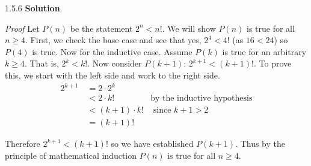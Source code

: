 \documentclass[11pt,]{book}
\makeatletter
\theoremstyle{ptxplainnotitle}
\theoremstyle{ptxplaintitle}
\renewcommand*{\proofname}{Proof}
\renewenvironment{proof}[1][\proofname]{\par
  \pushQED{\qed}%
  \normalfont \topsep6\p@\@plus6\p@\relax
  \trivlist
  \item\relax
    {\itshape
    #1\@addpunct{.}}\hspace\labelsep\ignorespaces
}{%
  \popQED\endtrivlist\@endpefalse
}
\theoremstyle{ptxdefinitionnotitle}
\theoremstyle{ptxdefinitiontitle}
\theoremstyle{ptxdefinitionnotitle}
\theoremstyle{ptxdefinitiontitle}
\theoremstyle{ptxdefinitionnotitle}
\theoremstyle{ptxdefinitiontitle}
\theoremstyle{ptxdefinitiontitlenonumber}
\theoremstyle{ptxdefinitiontitlenonumber}
\numberwithin{equation}{chapter}
\newcommand{\lt}{<}
\newcommand{\gt}{>}
\newcommand{\amp}{&}
\makeatother
\begin{document}
\begin{divisionexercise}{1.5.6}
\textbf{Solution}.\quad%
\begin{proof}\hypertarget{proof-9}{}
\hypertarget{p-601}{}%
Let \(P(n)\) be the statement \(2^n \lt  n!\). We will show \(P(n)\) is true for all \(n \ge 4\). First, we check the base case and see that yes, \(2^4 \lt  4!\) (as \(16 \lt  24\)) so \(P(4)\) is true. Now for the inductive case. Assume \(P(k)\) is true for an arbitrary \(k \ge 4\). That is, \(2^k \lt  k!\). Now consider \(P(k+1)\): \(2^{k+1} \lt  (k+1)!\). To prove this, we start with the left side and work to the right side.%
\begin{align*}
2^{k+1}~ \amp = 2\cdot 2^k \amp\\
\amp \lt 2\cdot k! \amp \text{by the inductive hypothesis}\\
\amp \lt (k+1) \cdot k! \amp \text{ since } k+1 \gt 2\\
\amp = (k+1)! \amp
\end{align*}
%
\par
\hypertarget{p-602}{}%
Therefore \(2^{k+1} \lt  (k+1)!\) so we have established \(P(k+1)\). Thus by the principle of mathematical induction \(P(n)\) is true for all \(n \ge 4\).%
\end{proof}
\end{divisionexercise}%
\end{document}
